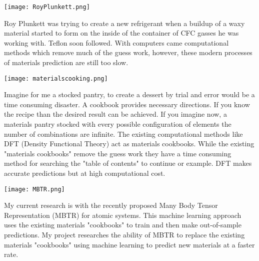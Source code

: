 \documentclass[a0,portrait]{a0poster}
\begin{document}
\begin{multicols}{2}
\begin{center}\vspace{1cm}
\texttt{[image: RoyPlunkett.png]}
\end{center}\vspace{1cm}

Roy Plunkett was trying to create a new refrigerant when a buildup of a waxy material started to form on the inside of the container of CFC gasses he was working with. Teflon soon followed.
With computers came computational methods which remove much of the guess work, however, these modern processes of materials prediction are still too slow. 

\begin{center}\vspace{1cm}
\texttt{[image: materialscooking.png]}
\end{center}\vspace{1cm}

Imagine for me a stocked pantry, to create a dessert by trial and error would be a time consuming disaster. A cookbook provides necessary directions. If you know the recipe than the desired result can be achieved. If you imagine now, a materials pantry stocked with every possible configuration of elements the number of combinations are infinite. The existing computational methods like DFT (Density Functional Theory) act as materials cookbooks. While the existing "materials cookbooks" remove the guess work they have a time consuming method for searching the "table of contents" to continue or example. DFT makes accurate predictions but at high computational cost.    

\begin{center}\vspace{1cm}
\texttt{[image: MBTR.png]}
\end{center}\vspace{1cm}

My current research is with the recently proposed Many Body Tensor Representation (MBTR) for atomic systems. This machine learning approach uses the existing materials "cookbooks" to train and then make out-of-sample predictions. My project researches the ability of MBTR to replace the existing materials "cookbooks" using machine learning to predict new materials at a faster rate.



\end{multicols}
\end{document}
